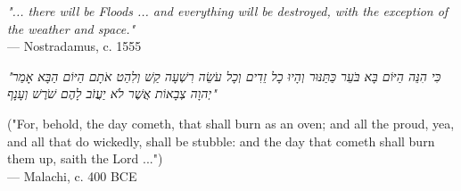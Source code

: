 \begin{flushright}
\emph{"... there will be Floods ... and everything will be destroyed, with the exception of the weather and space."}\\
— Nostradamus, c. 1555
\end{flushright}

\vspace{2em}

\begin{flushright}
\begin{hebrew}
\emph{"כִּי הִנֵּה הַיּוֹם בָּא בֹּעֵר כַּתַּנּוּר וְהָיוּ כָל זֵדִים וְכָל עֹשֵׂה רִשְׁעָה קַשׁ וְלִהַט אֹתָם הַיּוֹם הַבָּא אָמַר יְהוָה צְבָאוֹת אֲשֶׁר לֹא יַעֲזֹב לָהֶם שֹׁרֶשׁ וְעָנָף"} \\
\end{hebrew}
("For, behold, the day cometh, that shall burn as an oven; and all the proud, yea, and all that do wickedly, shall be stubble: and the day that cometh shall burn them up, saith the Lord ...") \\
— Malachi, c. 400 BCE
\end{flushright}
